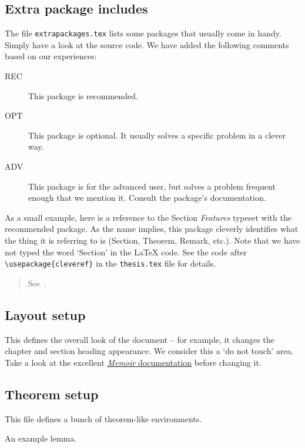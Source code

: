 \subsection{Extra package includes}

The file \texttt{extrapackages.tex} lists some packages that usually
come in handy.  Simply have a look at the source code.  We have
added the following comments based on our experiences:
\begin{description}
\item[REC] This package is recommended.
\item[OPT] This package is optional.  It usually solves a specific
  problem in a clever way.
\item[ADV] This package is for the advanced user, but solves a problem
  frequent enough that we mention it. Consult the package's
  documentation.
\end{description}

As a small example, here is a reference to the Section \emph{Features}
typeset with the recommended  package. As the name implies,
this package cleverly identifies what the thing it is referring to is (Section, Theorem, Remark, etc.).
Note that we have not typed the word `Section' in the \LaTeX{} code.
See the code after \lstinline|\usepackage{cleveref}| in the \lstinline|thesis.tex| file for details.
\begin{quote}
  See~.
\end{quote}


\subsection{Layout setup}

This defines the overall look of the document -- for example, it
changes the chapter and section heading appearance.  We consider this
a `do not touch' area.  Take a look at the excellent 
\href{https://ctan.math.washington.edu/tex-archive/macros/latex/contrib/memoir/memman.pdf}{\emph{Memoir}
documentation} before changing it.


\subsection{Theorem setup}

This file defines a bunch of theorem-like environments.

\begin{lemma}\label{lem:example}
  An example lemma.
\end{lemma}

